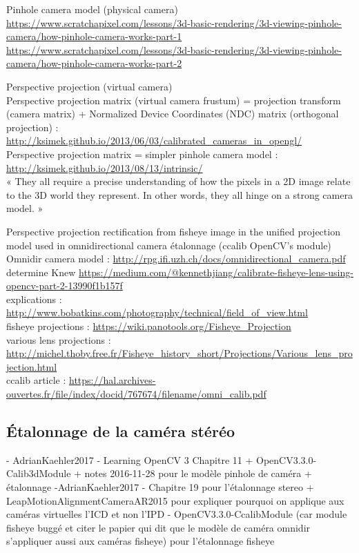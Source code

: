 
Pinhole camera model (physical camera)\\
\url{https://www.scratchapixel.com/lessons/3d-basic-rendering/3d-viewing-pinhole-camera/how-pinhole-camera-works-part-1}\\
\url{https://www.scratchapixel.com/lessons/3d-basic-rendering/3d-viewing-pinhole-camera/how-pinhole-camera-works-part-2}

Perspective projection (virtual camera)\\
Perspective projection matrix (virtual camera frustum) = projection transform (camera matrix) + Normalized Device Coordinates (NDC) matrix (orthogonal projection) : \url{http://ksimek.github.io/2013/06/03/calibrated_cameras_in_opengl/}\\
Perspective projection matrix = simpler pinhole camera model : \url{http://ksimek.github.io/2013/08/13/intrinsic/}\\
« They all require a precise understanding of how the pixels in a 2D image relate to the 3D world they represent. In other words, they all hinge on a strong camera model. »

Perspective projection rectification from fisheye image in the unified projection model used in omnidirectional camera étalonnage (ccalib OpenCV's module)\\
Omnidir camera model : \url{http://rpg.ifi.uzh.ch/docs/omnidirectional_camera.pdf}\\
determine Knew \url{https://medium.com/@kennethjiang/calibrate-fisheye-lens-using-opencv-part-2-13990f1b157f}\\
explications : \url{http://www.bobatkins.com/photography/technical/field_of_view.html}\\
fisheye projections : \url{https://wiki.panotools.org/Fisheye_Projection}\\
various lens projections : \url{http://michel.thoby.free.fr/Fisheye_history_short/Projections/Various_lens_projection.html}\\
ccalib article : \url{https://hal.archives-ouvertes.fr/file/index/docid/767674/filename/omni_calib.pdf}


\subsection{Étalonnage de la caméra stéréo}

- AdrianKaehler2017 - Learning OpenCV 3 Chapitre 11 + OpenCV3.3.0-Calib3dModule + notes 2016-11-28 pour le modèle pinhole de caméra + étalonnage
-AdrianKaehler2017 -  Chapitre 19 pour l'étalonnage stereo + LeapMotionAlignmentCameraAR2015 pour expliquer pourquoi on applique aux caméras virtuelles l'ICD et non l'IPD
- OpenCV3.3.0-CcalibModule (car module fisheye buggé et citer le papier qui dit que le modèle de caméra omnidir s'appliquer aussi aux caméras fisheye) pour l'étalonnage fisheye

